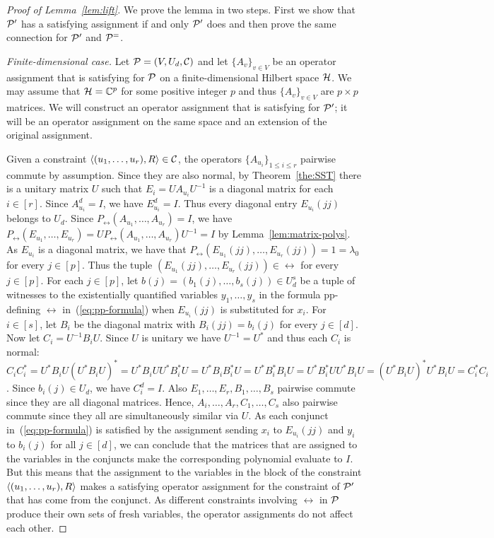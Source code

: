 \documentclass[11pt,letter]{article}
\begin{document}
\begin{proof}[Proof of Lemma~\ref{lem:lift}] 
We prove the lemma in two steps. First we show that ${\mathcal P}'$ has a satisfying assignment if and only ${\mathcal P}'$ does and then prove the same connection for ${\mathcal P}'$ and ${\mathcal P}^=$. 

{\it Finite-dimensional case.}
Let ${\mathcal P}=(V,U_d,{\mathcal C})$ and let $\{A_v\}_{v\in V}$ be an
  operator assignment that is satisfying for ${\mathcal P}$ on a finite-dimensional
  Hilbert space ${\mathcal H}$. We may assume that ${\mathcal H}={\mathbb C}^p$ for some positive integer
  $p$
and thus $\{A_v\}_{v\in V}$ are $p\times p$ matrices. We will
  construct an operator assignment that is satisfying for ${\mathcal P}'$; it will be an
  operator assignment on the same space and an extension of the original
  assignment.
 
  Given a constraint $\langle (u_1,\ldots,u_r),R \rangle\in{\mathcal C}$, the operators
  $\{A_{u_i}\}_{1\leq i\leq r}$ pairwise commute by assumption. Since they are
  also normal, by Theorem~\ref{the:SST} there is a unitary matrix $U$ such that
  $E_i=UA_{u_i}U^{-1}$ is a diagonal matrix for each $i\in [r]$. Since $A_{u_i}^d=I$,
  we have $E_{u_i}^d=I$. Thus every diagonal entry $E_{u_i}(jj)$ belongs to
  $U_d$. Since $P_\rel(A_{u_1},\ldots,A_{u_r})=I$, we have $P_\rel(E_{u_1},\ldots,E_{u_r})=UP_\rel(A_{u_1},\ldots,A_{u_r})U^{-1}=I$ by Lemma~\ref{lem:matrix-polys}. As
  $E_{u_i}$ is a diagonal matrix, we have that
  $P_\rel(E_{u_1}(jj),\ldots,E_{u_r}(jj))=1=\lambda_0$ for every $j\in [p]$.
  Thus the tuple $(E_{u_1}(jj),\ldots,E_{u_r}(jj))\in\rel$ for every $j\in [p]$. 
  For each $j\in [p]$, let $b(j)=(b_1(j),\ldots,b_s(j))\in U_d^s$ be a tuple of
  witnesses to the existentially quantified variables $y_1,\ldots,y_s$ in the
  formula pp-defining $\rel$ in~(\ref{eq:pp-formula}) when $E_{u_i}(jj)$ is
  substituted for $x_i$. For $i\in [s]$, let $B_i$ be the diagonal matrix with
  $B_i(jj)=b_i(j)$ for every $j\in [d]$. Now let $C_i=U^{-1}B_iU$. Since $U$ is
  unitary we have $U^{-1}=U^*$ and thus each $C_i$ is 
  normal:
  $C_iC_i^*=U^*B_iU(U^*B_iU)^*=U^*B_iUU^*B_i^*U
  =U^*B_iB_i^*U
  =U^*B_i^*B_iU
  =U^*B_i^*UU^*B_iU
  =(U^*B_iU)^*U^*B_iU=C_i^*C_i$.
  Since $b_i(j)\in U_d$, we have $C_i^d=I$. Also
  $E_1,\ldots,E_r,B_1,\ldots,B_s$ pairwise commute since they are all diagonal
  matrices. Hence, $A_i,\ldots,A_r,C_1,\ldots,C_s$ also pairwise commute since
  they all are simultaneously similar via $U$.
As each conjunct in~(\ref{eq:pp-formula}) is satisfied by the assignment
  sending $x_i$ to $E_{u_i}(jj)$ and $y_i$ to $b_i(j)$ for all $j\in [d]$, we
  can conclude that the matrices that are assigned to the variables in the
  conjuncts make the corresponding polynomial evaluate to $I$. But
  this means that the assignment to the variables in the block of the constraint
  $\langle (u_1,\ldots,u_r),R \rangle$ makes a satisfying operator assignment for the
  constraint of ${\mathcal P}'$ that has come from the conjunct. As different constraints involving $\rel$ in ${\mathcal P}$
  produce their own sets of fresh variables, the operator assignments do not
  affect each other.


\end{proof}
\end{document}
